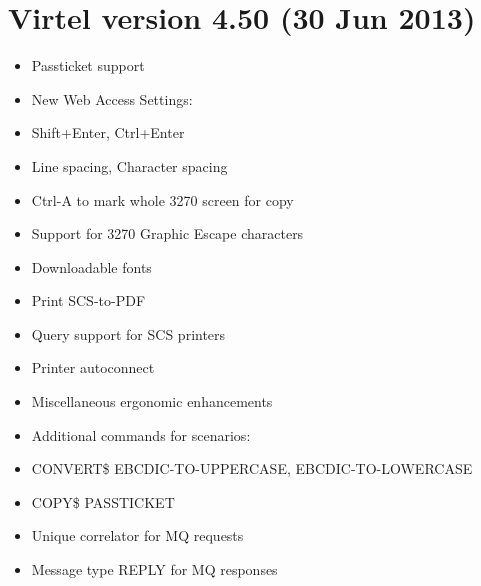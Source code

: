 \documentclass[letterpaper,10pt,english]{sphinxmanual}
\begin{document}
\section{Virtel version 4.50 (30 Jun 2013)}
\label{\detokenize{Installation_Guide:virtel-version-4-50-30-jun-2013}}
\begin{itemize}
\item {} 
Passticket support

\item {} 
New Web Access Settings:

\item {} 
Shift+Enter, Ctrl+Enter

\item {} 
Line spacing, Character spacing

\item {} 
Ctrl-A to mark whole 3270 screen for copy

\item {} 
Support for 3270 Graphic Escape characters

\item {} 
Downloadable fonts

\item {} 
Print SCS-to-PDF

\item {} 
Query support for SCS printers

\item {} 
Printer autoconnect

\item {} 
Miscellaneous ergonomic enhancements

\end{itemize}

\begin{itemize}
\item {} 
Additional commands for scenarios:

\item {} 
CONVERT\$ EBCDIC-TO-UPPERCASE, EBCDIC-TO-LOWERCASE

\item {} 
COPY\$ PASSTICKET

\end{itemize}

\begin{itemize}
\item {} 
Unique correlator for MQ requests

\item {} 
Message type REPLY for MQ responses

\end{itemize}
\end{document}
